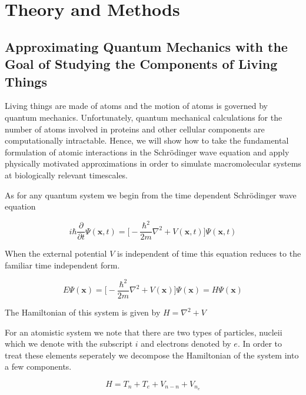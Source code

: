 \chapter{Theory and Methods}
\label{chap:methods}

\section{Approximating Quantum Mechanics with the Goal of Studying the Components of Living Things}
Living things are made of atoms and the motion of atoms is governed by quantum mechanics. Unfortunately, quantum mechanical calculations for the number of atoms involved in proteins and other cellular components are computationally intractable. Hence, we will show how to take the fundamental formulation of atomic interactions in the Schr\"{o}dinger wave equation and apply physically motivated approximations in order to simulate macromolecular systems at biologically relevant timescales. 

As for any quantum system we begin from the time dependent Schr\"{o}dinger wave equation 

\begin{equation}
i\hbar \frac {\partial}{\partial t} \Psi (\textbf{x},t) = \big[ -\frac{\hbar ^2}{2m}\nabla^2 + V (\textbf{x}, t) \big] \Psi (\textbf{x},t) 
\end{equation}

When the external potential $V$ is independent of time this equation reduces to the familiar time independent form. 

\begin{equation}
	E \Psi (\textbf{x}) = \big[ -\frac{\hbar ^2}{2m}\nabla^2 + V (\textbf{x}) \big] \Psi (\textbf{x}) = H \Psi(\textbf{x}) 
 \end{equation}

The Hamiltonian of this system is given by $H = \nabla^2 + V$ 

For an atomistic system we note that there are two types of particles, nucleii which we denote with the subscript $i$ and electrons denoted by $e$. In order to treat these elements seperately we decompose the Hamiltonian of the system into a few components. 

\begin {equation}
H = T_n + T_e + V_{n-n} + V_{n_e}
\end{equation}

